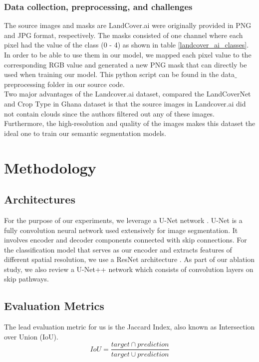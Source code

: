 \documentclass[conference]{IEEEtran}
\begin{document}
\subsubsection{Data collection, preprocessing, and challenges}
The source images and masks are LandCover.ai were originally provided in PNG and JPG format, respectively. The masks consisted of one channel where each pixel had the value of the class (0 - 4) as shown in table \ref{landcover_ai_classes}. In order to be able to use them in our model, we mapped each pixel value to the corresponding RGB value and generated a new PNG mask that can directly be used when training our model. This python script can be found in the data$\_$preprocessing folder in our source code. \\ \indent
Two major advantages of the Landcover.ai dataset, compared the LandCoverNet and Crop Type in Ghana dataset is that the source images  in Landcover.ai did not contain clouds since the authors \cite{DBLP:journals/corr/abs-2005-02264} filtered out any of these images. Furthermore, the high-resolution and quality of the images makes this dataset the ideal one to train our semantic segmentation models.      



\section{Methodology}
\subsection{Architectures}

For the purpose of our experiments, we leverage a U-Net network \cite{ronneberger2015unet}. U-Net is a fully convolution neural network used extensively for image segmentation. It involves encoder and decoder components connected with skip connections. For the classification model that serves as our encoder and extracts features of different spatial resolution, we use a ResNet architecture \cite{DBLP:journals/corr/HeZRS15}. As part of our ablation study, we also review a U-Net++ network \cite{DBLP:journals/corr/abs-1807-10165} which consists of convolution layers on skip pathways.

\subsection{Evaluation Metrics}
 The lead evaluation metric for us is the Jaccard Index, also known as Intersection over Union (IoU).
\begin{equation*}
    IoU=\frac{target \cap prediction}{target \cup prediction}
\end{equation*}
\end{document}
